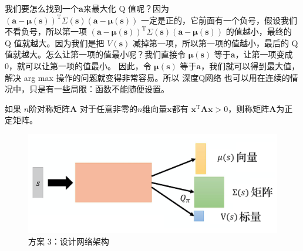   我们要怎么找到一个$\boldsymbol{a}$来最大化 Q 值呢？因为 $(\boldsymbol{a}-\pmb{\mu}(\boldsymbol{s}))^{\mathrm{T}} \pmb{\varSigma}(\boldsymbol{s})(\boldsymbol{a}-\pmb{\mu}(\boldsymbol{s}))$ 一定是正的，它前面有一个负号，假设我们不看负号，所以第一项 $(\boldsymbol{a}-\pmb{\mu}(\boldsymbol{s}))^{\mathrm{T}} \pmb{\varSigma}(\boldsymbol{\boldsymbol{s}})(\boldsymbol{a}-\pmb{\mu}(\boldsymbol{s}))$ 的值越小，最终的 Q 值就越大。因为我们是把 $V(\boldsymbol{s})$ 减掉第一项，所以第一项的值越小，最后的 Q 值就越大。怎么让第一项的值最小呢？我们直接令 $\pmb{\mu}(\boldsymbol{s})$ 等于$\boldsymbol{a}$，让第一项变成 0，就可以让第一项的值最小。 因此，令 $\pmb{\mu}(\boldsymbol{s})$ 等于$\boldsymbol{a}$，我们就可以得到最大值，解决 arg max 操作的问题就变得非常容易。所以 深度Q网络 也可以用在连续的情况中，只是有一些局限：函数不能随便设置。
    
  \begin{tcolorbox}[colframe=blue!25,colback=blue!10]
    如果 $n$阶对称矩阵$\boldsymbol{A}$ 对于任意非零的$n$维向量$\boldsymbol{x}$都有 $\boldsymbol{x}^\mathrm{T}\boldsymbol{A}\boldsymbol{x}>0$，则称矩阵$\boldsymbol{A}$为正定矩阵。
    \end{tcolorbox}
  
  

  \begin{figure}[htpb]
    \centering
    \includegraphics[width=0.5\linewidth]{res/ch8/8.2}
    \caption{方案 3：设计网络架构}
    \label{fig:fig8.2}
\end{figure} 

